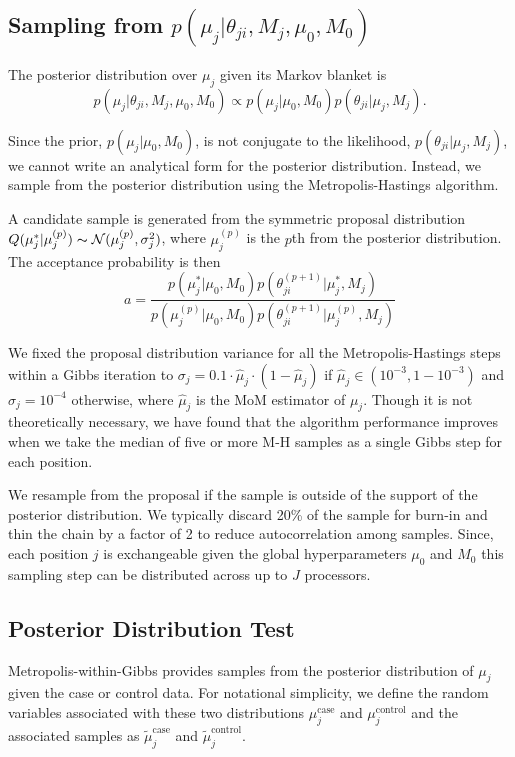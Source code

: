 \documentclass{bioinfo}
\begin{document}
\subsection{Sampling from $p \left( \mu_j |\theta_{ji},M_j,\mu_0,M_0\right)$}
The posterior distribution over $\mu_j$ given its Markov blanket is
\begin{equation}
	p( \mu_j | \theta_{ji}, M_j, \mu_0, M_0 ) \propto p(\mu_j | \mu_0, M_0) p(\theta_{ji} | \mu_j, M_j).
\end{equation}

Since the prior, $p(\mu_j | \mu_0, M_0)$, is not conjugate to the likelihood, $p(\theta_{ji} | \mu_j, M_j)$, we cannot write an analytical form for the posterior distribution. Instead, we sample from the posterior distribution using the Metropolis-Hastings algorithm.

A candidate sample is generated from the symmetric proposal distribution $Q(\mu_j^* | \mu_j^{(p)}) \thicksim \mathcal{N}(\mu_j^{(p)}, \sigma_j^2)$, where $\mu_j^{(p)}$ is the $p$th from the posterior distribution. The acceptance probability is then
\begin{equation}
	a = \frac{ p(\mu_j^* | \mu_0, M_0) p(\theta^{(p+1)}_{ji} | \mu_j^*, M_j) } {p(\mu_j^{(p)} | \mu_0, M_0) p(\theta^{(p+1)}_{ji} | \mu_j^{(p)}, M_j)}
\end{equation}

We fixed the proposal distribution variance for all the Metropolis-Hastings steps within a Gibbs iteration to $\sigma_j = 0.1 \cdot \hat{\mu}_j\cdot (1-\hat{\mu}_j)$ if $\hat{\mu}_j \in (10^{-3},1-10^{-3})$ and $\sigma_j = 10^{-4}$ otherwise, where $\hat{\mu}_j$ is the MoM estimator of $\mu_j$. Though it is not theoretically necessary, we have found that the algorithm performance improves when we take the median of five or more M-H samples as a single Gibbs step for each position.


We resample from the proposal if the sample is outside of the support of the posterior distribution. We typically discard 20\% of the sample for burn-in and thin the chain by a factor of 2 to reduce autocorrelation among samples. Since, each position $j$ is exchangeable given the global hyperparameters $\mu_0$ and $M_0$ this sampling step can be distributed across up to $J$ processors.

\subsection{Posterior Distribution Test}\label{sec:hypothesis_test}
Metropolis-within-Gibbs provides samples from the posterior distribution of $\mu_j$ given the case or control data. For notational simplicity, we define the random variables associated with these two distributions $\mu_j^{\text{case}}$ and $\mu_j^{\text{control}}$ and the associated samples as $\tilde{\mu}_j^{\text{case}}$ and $\tilde{\mu}_j^{\text{control}}$.
\end{document}
